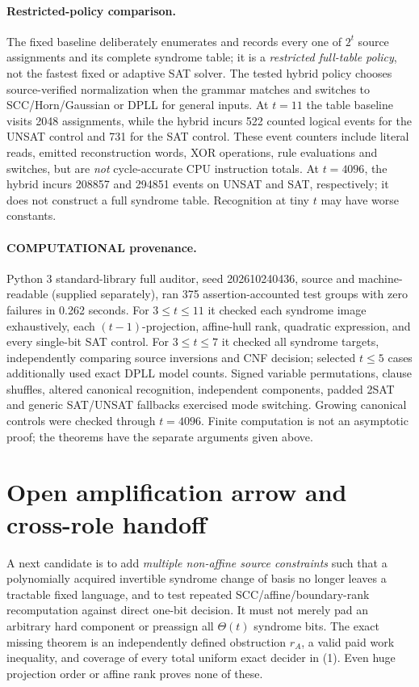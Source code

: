 \documentclass[11pt]{article}
\begin{document}
\paragraph{Restricted-policy comparison.}
The fixed baseline deliberately enumerates and records every one of
\(2^t\) source assignments and its complete syndrome table; it is a
\emph{restricted full-table policy}, not the fastest fixed or adaptive
SAT solver. The tested hybrid policy chooses source-verified
normalization when the grammar matches and switches to SCC/Horn/Gaussian
or DPLL for general inputs. At \(t=11\) the table baseline visits
2048 assignments, while the hybrid incurs 522 counted logical events
for the UNSAT control and 731 for the SAT control. These event counters
include literal reads, emitted reconstruction words, XOR operations,
rule evaluations and switches, but are \emph{not} cycle-accurate CPU
instruction totals. At \(t=4096\), the hybrid incurs 208857 and 294851
events on UNSAT and SAT, respectively; it does not construct a full
syndrome table. Recognition at tiny \(t\) may have worse constants.

\paragraph{COMPUTATIONAL provenance.}
Python 3 standard-library full auditor, seed 202610240436, source
 and machine-readable
 (supplied separately), ran
375 assertion-accounted test groups with zero failures in 0.262 seconds.
For \(3\le t\le11\) it checked each syndrome image exhaustively,
each \((t-1)\)-projection, affine-hull rank, quadratic expression,
and every single-bit SAT control. For \(3\le t\le7\) it checked all
syndrome targets, independently comparing source inversions and CNF
decision; selected \(t\le5\) cases additionally used exact DPLL
model counts. Signed variable permutations, clause shuffles, altered
canonical recognition, independent components, padded 2SAT and
generic SAT/UNSAT fallbacks exercised mode switching. Growing
canonical controls were checked through \(t=4096\).
Finite computation is not an asymptotic proof; the theorems have the
separate arguments given above.

\section{Open amplification arrow and cross-role handoff}
A next candidate is to add \emph{multiple non-affine source
constraints} such that a polynomially acquired invertible syndrome
change of basis no longer leaves a tractable fixed language, and to
test repeated SCC/affine/boundary-rank recomputation against direct
one-bit decision. It must not merely pad an arbitrary hard component
or preassign all \(\Theta(t)\) syndrome bits. The exact missing theorem
is an independently defined obstruction \(r_A\), a valid paid work
inequality, and coverage of every total uniform exact decider in (1).
Even huge projection order or affine rank proves none of these.
\end{document}
